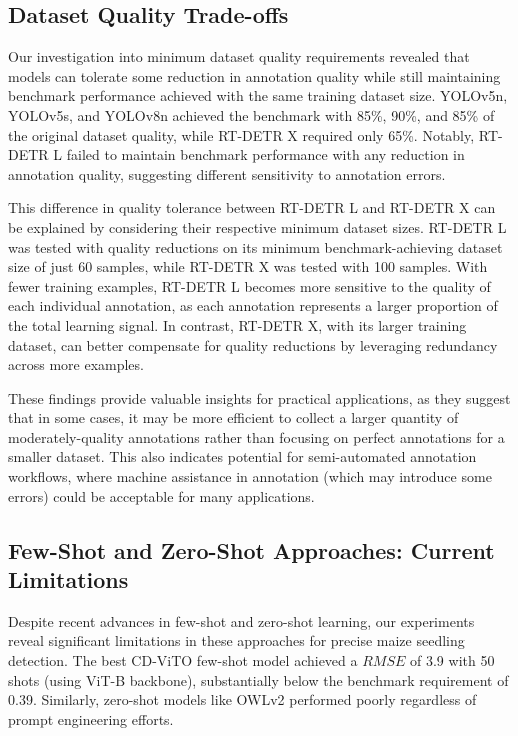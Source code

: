 \documentclass[journal,article,submit,pdftex,moreauthors]{Definitions/mdpi}
\begin{document}
\subsection{Dataset Quality Trade-offs}
Our investigation into minimum dataset quality requirements revealed that models can tolerate some reduction 
in annotation quality while still maintaining benchmark performance achieved with the
same training dataset size. YOLOv5n, YOLOv5s, and YOLOv8n achieved 
the benchmark with 85\%, 90\%, and 85\% of the original dataset quality, while RT-DETR X required 
only 65\%. Notably, RT-DETR L failed to maintain benchmark performance with any reduction in annotation quality, 
suggesting different sensitivity to annotation errors.

This difference in quality tolerance between RT-DETR L and RT-DETR X can be explained by considering their 
respective minimum dataset sizes. RT-DETR L was tested with quality reductions on its minimum benchmark-achieving 
dataset size of just 60 samples, while RT-DETR X was tested with 100 samples. With fewer training examples, 
RT-DETR L becomes more sensitive to the quality of each individual annotation, as each annotation represents 
a larger proportion of the total learning signal. In contrast, RT-DETR X, with its larger training dataset, 
can better compensate for quality reductions by leveraging redundancy across more examples.

These findings provide valuable insights for practical applications, as they suggest that in some 
cases, it may be more efficient to collect a larger quantity of moderately-quality annotations 
rather than focusing on perfect annotations for a smaller dataset. This also indicates potential 
for semi-automated annotation workflows, where machine assistance in annotation (which may introduce 
some errors) could be acceptable for many applications.

\subsection{Few-Shot and Zero-Shot Approaches: Current Limitations}
Despite recent advances in few-shot and zero-shot learning, our experiments reveal significant 
limitations in these approaches for precise maize seedling detection. The best CD-ViTO few-shot 
model achieved a $RMSE$ of 3.9 with 50 shots (using ViT-B backbone), substantially below the benchmark 
requirement of 0.39. Similarly, zero-shot models like OWLv2 performed poorly regardless of prompt 
engineering efforts.
\end{document}
